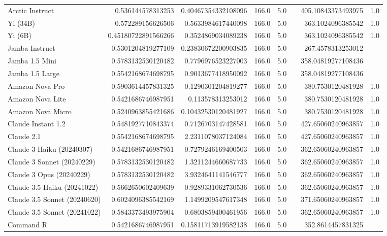 \begin{table}[htp]
{\begin{tabular}{lrrrrrrr}
Arctic Instruct & 0.536144578313253 & 0.40467354332108096 & 166.0 & 5.0 &  & 405.10843373493975 & 1.0 \\
Yi (34B) & 0.572289156626506 & 0.5633984617440098 & 166.0 & 5.0 &  & 363.1024096385542 & 1.0 \\
Yi (6B) & 0.45180722891566266 & 0.3524869034089238 & 166.0 & 5.0 &  & 363.1024096385542 & 1.0 \\
Jamba Instruct & 0.5301204819277109 & 0.23830672200903835 & 166.0 & 5.0 &  & 267.4578313253012 &  \\
Jamba 1.5 Mini & 0.5783132530120482 & 0.7796976523227003 & 166.0 & 5.0 &  & 358.04819277108436 &  \\
Jamba 1.5 Large & 0.5542168674698795 & 0.9013677418950092 & 166.0 & 5.0 &  & 358.04819277108436 &  \\
Amazon Nova Pro & 0.5903614457831325 & 0.1290301204819277 & 166.0 & 5.0 &  & 380.7530120481928 & 1.0 \\
Amazon Nova Lite & 0.5421686746987951 & 0.113578313253012 & 166.0 & 5.0 &  & 380.7530120481928 & 1.0 \\
Amazon Nova Micro & 0.5240963855421686 & 0.10432530120481927 & 166.0 & 5.0 &  & 380.7530120481928 & 1.0 \\
Claude Instant 1.2 & 0.5481927710843374 & 0.7126703147428581 & 166.0 & 5.0 &  & 427.65060240963857 & 1.0 \\
Claude 2.1 & 0.5542168674698795 & 2.2311078037124084 & 166.0 & 5.0 &  & 427.65060240963857 & 1.0 \\
Claude 3 Haiku (20240307) & 0.5421686746987951 & 0.7279246169400503 & 166.0 & 5.0 &  & 362.65060240963857 & 1.0 \\
Claude 3 Sonnet (20240229) & 0.5783132530120482 & 1.3211244660687733 & 166.0 & 5.0 &  & 362.65060240963857 & 1.0 \\
Claude 3 Opus (20240229) & 0.5783132530120482 & 3.9324641141546777 & 166.0 & 5.0 &  & 362.65060240963857 & 1.0 \\
Claude 3.5 Haiku (20241022) & 0.5662650602409639 & 0.9289331062730536 & 166.0 & 5.0 &  & 362.65060240963857 & 1.0 \\
Claude 3.5 Sonnet (20240620) & 0.6024096385542169 & 1.1499209547617348 & 166.0 & 5.0 &  & 371.65060240963857 & 1.0 \\
Claude 3.5 Sonnet (20241022) & 0.5843373493975904 & 0.6803859400461956 & 166.0 & 5.0 &  & 362.65060240963857 & 1.0 \\
Command R & 0.5421686746987951 & 0.15811713919582138 & 166.0 & 5.0 &  & 352.8614457831325 &  \\

\end{tabular}}
\end{table}
